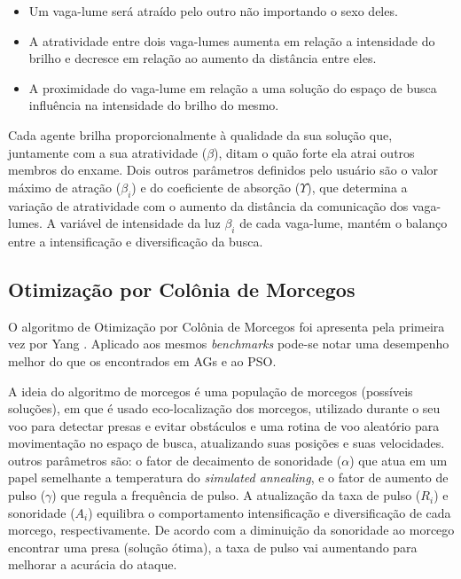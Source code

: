 \begin{itemize}
\item Um vaga-lume será atraído pelo outro não importando o sexo deles.

\item A atratividade entre dois vaga-lumes aumenta em relação a intensidade do brilho e decresce em relação ao aumento da distância entre eles.

\item A proximidade do vaga-lume em relação a uma solução do espaço de busca influência na intensidade do brilho do mesmo.
\end{itemize}

Cada agente brilha proporcionalmente à qualidade da sua solução que, juntamente com a sua atratividade ($\beta$), ditam o quão forte ela atrai outros membros do enxame. Dois outros parâmetros definidos pelo usuário são o valor máximo de atração ($\beta_i$) e do coeficiente de absorção ($\Upsilon$), que determina a variação de atratividade com o aumento da distância da comunicação dos vaga-lumes. A variável
de intensidade da luz $\beta_i$ de cada vaga-lume, mantém o balanço entre a intensificação e diversificação da busca.

\subsection{Otimização por Colônia de Morcegos}
\label{sec:bat_algorithm}
O algoritmo de Otimização por Colônia de Morcegos foi apresenta pela primeira vez por Yang \cite{bat}. Aplicado aos mesmos \textit{benchmarks} pode-se notar uma desempenho melhor do que os encontrados em AGs e ao PSO. 

A ideia do algoritmo de morcegos é uma população de morcegos (possíveis soluções), em que é usado eco-localização dos morcegos, utilizado durante o seu voo para detectar presas e evitar obstáculos e uma rotina de voo aleatório para movimentação no espaço de busca, atualizando suas posições e suas velocidades. outros parâmetros são: o fator de decaimento de sonoridade ($\alpha$) que atua em um papel semelhante a temperatura do \textit{simulated annealing}, e o fator de aumento de pulso ($\gamma$) que regula a frequência de pulso. A atualização da taxa de pulso ($R_i$) e sonoridade ($A_i$) equilibra o comportamento intensificação e diversificação de cada morcego, respectivamente. De acordo com a diminuição da sonoridade ao morcego encontrar uma presa (solução ótima), a taxa de pulso vai aumentando para melhorar a acurácia do ataque. 


